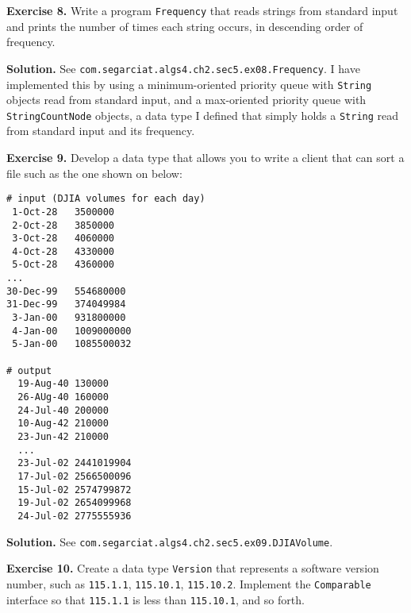 \documentclass[12pt, a4paper]{article}
\newenvironment{ex}[2][Exercise]
{\par\medskip\noindent \textbf{#1 #2.}}
{\medskip}
\newenvironment{sol}[1][Solution]
{\par\medskip\noindent \textbf{#1.} }
{\medskip}
\begin{document}
	\begin{ex}{8}
		Write a program \texttt{Frequency} that reads strings from standard input and
		prints the number of times each string occurs, in descending order of frequency.
	\end{ex}
	\begin{sol}
		See \texttt{com.segarciat.algs4.ch2.sec5.ex08.Frequency}. I have implemented
		this by using a minimum-oriented priority queue with \texttt{String} objects
		read from standard input, and a max-oriented priority queue with \texttt{StringCountNode}
		objects, a data type I defined that simply holds a \texttt{String} read from
		standard input and its frequency.
	\end{sol}
	\begin{ex}{9}
		Develop a data type that allows you to write a client that can sort a file
		such as the one shown on below:
		\begin{lstlisting}[language={}]
# input (DJIA volumes for each day)
 1-Oct-28	3500000
 2-Oct-28	3850000
 3-Oct-28	4060000
 4-Oct-28	4330000
 5-Oct-28	4360000
...
30-Dec-99	554680000
31-Dec-99	374049984
 3-Jan-00	931800000
 4-Jan-00	1009000000
 5-Jan-00	1085500032
 
# output
  19-Aug-40 130000
  26-AUg-40	160000
  24-Jul-40	200000
  10-Aug-42 210000
  23-Jun-42 210000
  ...
  23-Jul-02 2441019904
  17-Jul-02 2566500096
  15-Jul-02 2574799872
  19-Jul-02 2654099968
  24-Jul-02 2775555936
		\end{lstlisting}
	\end{ex}
	\begin{sol}
		See \texttt{com.segarciat.algs4.ch2.sec5.ex09.DJIAVolume}.
	\end{sol}
	\begin{ex}{10}
		Create a data type \texttt{Version} that represents a software version number,
		such as \texttt{115.1.1}, \texttt{115.10.1}, \texttt{115.10.2}. Implement
		the \texttt{Comparable} interface so that \texttt{115.1.1} is less than
		\texttt{115.10.1}, and so forth.
	\end{ex}
	\pagebreak
	\printbibliography
\end{document}
